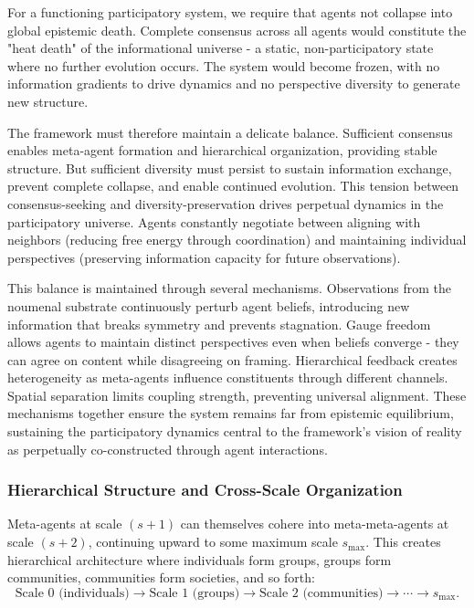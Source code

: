 \documentclass[11pt]{article}
\begin{document}
For a functioning participatory system, we require that agents not collapse into global epistemic death. Complete consensus across all agents would constitute the "heat death" of the informational universe - a static, non-participatory state where no further evolution occurs. The system would become frozen, with no information gradients to drive dynamics and no perspective diversity to generate new structure.

The framework must therefore maintain a delicate balance. Sufficient consensus enables meta-agent formation and hierarchical organization, providing stable structure. But sufficient diversity must persist to sustain information exchange, prevent complete collapse, and enable continued evolution. This tension between consensus-seeking and diversity-preservation drives perpetual dynamics in the participatory universe. Agents constantly negotiate between aligning with neighbors (reducing free energy through coordination) and maintaining individual perspectives (preserving information capacity for future observations).

This balance is maintained through several mechanisms. Observations from the noumenal substrate continuously perturb agent beliefs, introducing new information that breaks symmetry and prevents stagnation. Gauge freedom allows agents to maintain distinct perspectives even when beliefs converge - they can agree on content while disagreeing on framing. Hierarchical feedback creates heterogeneity as meta-agents influence constituents through different channels. Spatial separation limits coupling strength, preventing universal alignment. These mechanisms together ensure the system remains far from epistemic equilibrium, sustaining the participatory dynamics central to the framework's vision of reality as perpetually co-constructed through agent interactions.

\subsubsection{Hierarchical Structure and Cross-Scale Organization}

Meta-agents at scale $(s+1)$ can themselves cohere into meta-meta-agents at scale $(s+2)$, continuing upward to some maximum scale $s_{\max}$. This creates hierarchical architecture where individuals form groups, groups form communities, communities form societies, and so forth:
\begin{equation}
\text{Scale 0 (individuals)} \to \text{Scale 1 (groups)} \to \text{Scale 2 (communities)} \to \cdots \to s_{\max}.
\end{equation}
\end{document}

